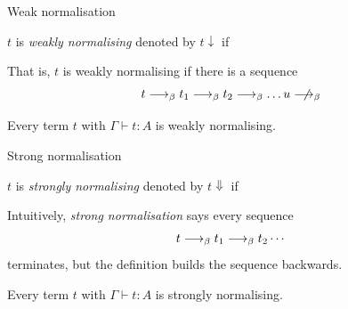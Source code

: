 \begin{frame}{Weak normalisation}
  \begin{definition}
    $t$ is \emph{weakly normalising} denoted by $t\downarrow$ if 
    \begin{multicols}{2}
      \begin{prooftree}
      \end{prooftree}
      \columnbreak
      \begin{prooftree}
      \end{prooftree}
    \end{multicols}
  \end{definition}
  That is, $t$ is weakly normalising if there is a sequence
  \[
    t \onereduce t_1 \onereduce t_2 \onereduce \dots u \notonereduce 
  \]
  \begin{theorem}
    Every term $t$ with $\Gamma \vdash t : A$ is weakly normalising.
  \end{theorem}
\end{frame}

\begin{frame}{Strong normalisation}
  \begin{definition}
    $t$ is \emph{strongly normalising} denoted by $t \Downarrow$ if 
    \begin{prooftree}
    \end{prooftree}
    
  \end{definition}
  Intuitively, \emph{strong normalisation} says every sequence
    \[
      t \onereduce t_1 \onereduce t_2 \cdots
    \]
  terminates, but the definition builds the sequence backwards. 

  \begin{theorem}
    Every term $t$ with $\Gamma \vdash t : A$ is strongly normalising.
  \end{theorem}
\end{frame}

%
%

